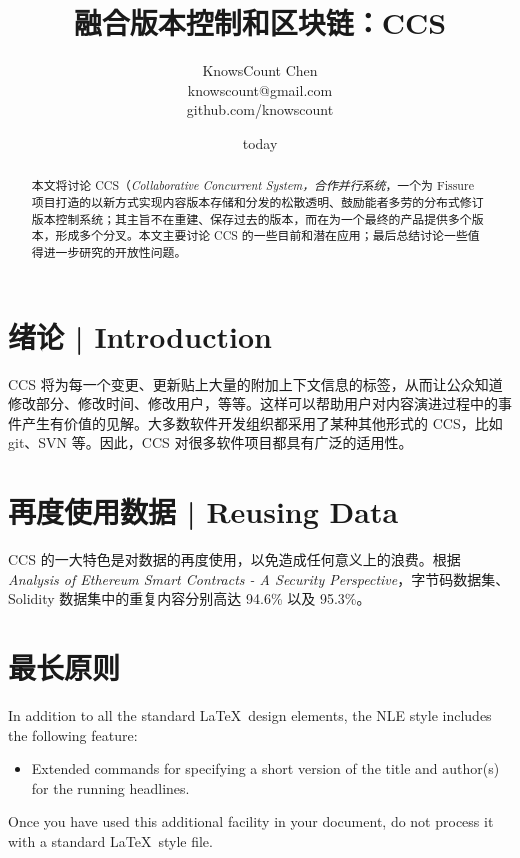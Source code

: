 \documentclass{cnle}
\title[Version Control, Blockchain, and CCS]
      {融合版本控制和区块链：CCS}
\author[KnowsCount]
       {KnowsCount Chen\\
        knowscount@gmail.com\\
        github.com/knowscount}
\date{today}
\begin{document}
\label{firstpage}
\maketitle

\begin{abstract}
本文将讨论 CCS（{\em Collaborative Concurrent System，合作并行系统\/}，一个为 Fissure 项目打造的以新方式实现内容版本存储和分发的松散透明、鼓励能者多劳的分布式修订版本控制系统；其主旨不在重建、保存过去的版本，而在为一个最终的产品提供多个版本，形成多个分叉。本文主要讨论 CCS 的一些目前和潜在应用；最后总结讨论一些值得进一步研究的开放性问题。
\end{abstract}

\section{绪论 | Introduction}

CCS 将为每一个变更、更新贴上大量的附加上下文信息的标签，从而让公众知道修改部分、修改时间、修改用户，等等。这样可以帮助用户对内容演进过程中的事件产生有价值的见解。大多数软件开发组织都采用了某种其他形式的 CCS，比如 git、SVN 等。因此，CCS 对很多软件项目都具有广泛的适用性。

\section{再度使用数据 | Reusing Data}

CCS 的一大特色是对数据的再度使用，以免造成任何意义上的浪费。根据 {\em Analysis of Ethereum Smart Contracts - A Security Perspective\/}，字节码数据集、Solidity 数据集中的重复内容分别高达 94.6\% 以及 95.3\%。



\section{最长原则}

In addition to all the standard \LaTeX\ design elements, the NLE style
includes the following feature:
\begin{itemize}
  \item Extended commands for specifying a short version
        of the title and author(s) for the running
        headlines.
\end{itemize}
Once you have used this additional facility in your document,
do not process it with a standard \LaTeX\ style file.
\end{document}
